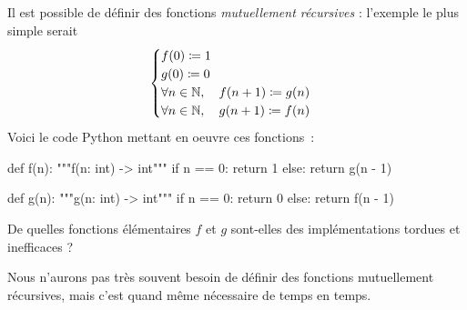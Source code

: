 \documentclass{magnoliaold}
\begin{document}
Il est possible de définir des fonctions
\emph{mutuellement récursives} : l'exemple le plus simple serait
\[
  \begin{cases}
    f(0) \coloneqq 1 \\
    g(0) \coloneqq 0 \\
    \forall n \in \mathbb{N},\quad f(n + 1) \coloneqq g(n) \\
    \forall n \in \mathbb{N},\quad g(n + 1) \coloneqq f(n)
  \end{cases}
\]
Voici le code Python mettant en oeuvre ces fonctions~:
\begin{pythoncodeline}
def f(n):
    """f(n: int) -> int"""
    if n == 0:
        return 1
    else:
        return g(n - 1)

def g(n):
    """g(n: int) -> int"""
    if n == 0:
        return 0
    else:
        return f(n - 1)
\end{pythoncodeline}

\begin{exoUnique}
\exo
  De quelles fonctions élémentaires $f$ et $g$ sont-elles des
  implémentations tordues et inefficaces ?
\end{exoUnique}
\vspace{2ex}
Nous n'aurons pas très souvent besoin de définir des fonctions mutuellement
récursives, mais c'est quand même nécessaire de temps en temps.

\end{document}

